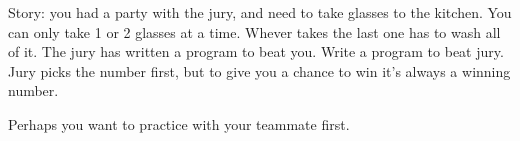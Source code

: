 Story: you had a party with the jury, and need to take glasses to the kitchen. You can only take 1 or 2 glasses at a time. Whever takes the last one has to wash all of it. The jury has written a program to beat you. Write a program to beat jury. Jury picks the number first, but to give you a chance to win it's always a winning number.

Perhaps you want to practice with your teammate first.

